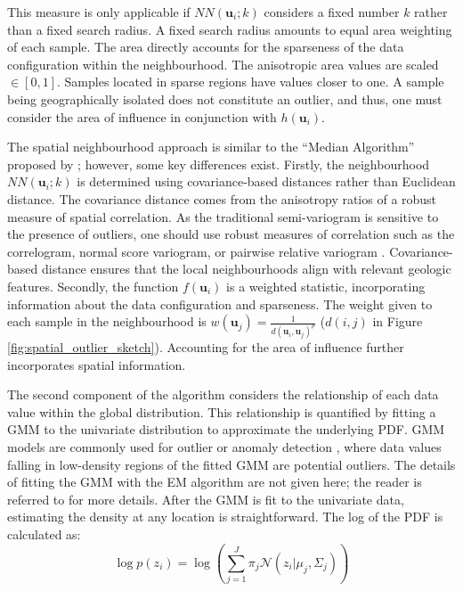 This measure is only applicable if $NN(\mathbf{u}_{i}; k)$ considers a fixed number $k$ rather than a fixed search radius. A fixed search radius amounts to equal area weighting of each sample. The area directly accounts for the sparseness of the data configuration within the neighbourhood. The anisotropic area values are scaled $\in [0,1]$. Samples located in sparse regions have values closer to one. A sample being geographically isolated does not constitute an outlier, and thus, one must consider the area of influence in conjunction with $h(\mathbf{u}_{i})$.

The spatial neighbourhood approach is similar to the ``Median Algorithm'' proposed by \cite{chen2008detecting}; however, some key differences exist. Firstly, the neighbourhood $NN(\mathbf{u}_{i}; k)$ is determined using covariance-based distances rather than Euclidean distance. The covariance distance comes from the anisotropy ratios of a robust measure of spatial correlation. As the traditional semi-variogram is sensitive to the presence of outliers, one should use robust measures of correlation such as the correlogram, normal score variogram, or pairwise relative variogram \citep{babakhani2014geostatistical,drumond2019using}. Covariance-based distance ensures that the local neighbourhoods align with relevant geologic features. Secondly, the function $f(\mathbf{u}_{i})$ is a weighted statistic, incorporating information about the data configuration and sparseness. The weight given to each sample in the neighbourhood is $w(\mathbf{u}_{j})=\frac{1}{d(\mathbf{u}_{i},\mathbf{u}_{j})^{p}}$ ($d(i,j)$ in Figure \ref{fig:spatial_outlier_sketch}). Accounting for the area of influence further incorporates spatial information.

The second component of the algorithm considers the relationship of each data value within the global distribution. This relationship is quantified by fitting a \gls{GMM} to the univariate distribution to approximate the underlying \gls{PDF}. \Gls{GMM} models are commonly used for outlier or anomaly detection \citep{geron2019hands,qu2021anomaly}, where data values falling in low-density regions of the fitted \gls{GMM} are potential outliers. The details of fitting the \gls{GMM} with the \gls{EM} algorithm are not given here; the reader is referred to \cite{mclachlan2019finite} for more details. After the \gls{GMM} is fit to the univariate data, estimating the density at any location is straightforward. The log of the \gls{PDF} is calculated as:
\begin{equation}
    \log p(z_{i}) = \log \left( \sum_{j=1}^{J} \pi_{j} \mathcal{N}(z_{i}|\mu_{j}, \Sigma_{j}) \right)
    \label{eq:logprob}
\end{equation}

